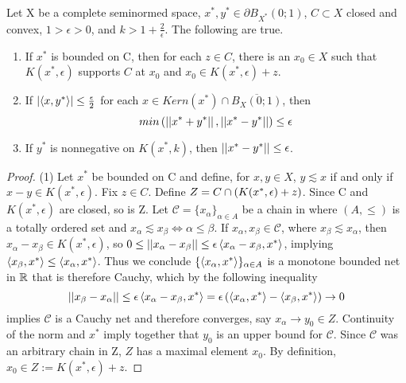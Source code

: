 \begin{lem}
    \label{lem:BishopPhelps}
    
    Let X be a complete seminormed space, $x^*,y^* \in \partial B_{X^*}(0;1)$, $C \subset X$ closed and convex, $1>\epsilon >0$, and $k>1+\frac{2}{\epsilon}$. The following are true. 
    \begin{enumerate}
        \item If $x^*$ is bounded on C, then for each $z \in C$, there is an $x_0 \in X$ such that $K(x^*,\epsilon)$ supports $C$ at $x_0$ and $x_0 \in K(x^*,\epsilon)+z$. 
        \item If $\left| \left\langle x,y^* \right\rangle \right|\leq \frac{\epsilon}{2}$ for each $x \in Kern(x^*) \cap \overline{B_X(0;1)}$, then 
        \begin{equation}
            min\left( \left|\left| x^*+y^* \right|\right|,\left|\left| x^*-y^* \right|\right|\right) \leq \epsilon
        \end{equation}
        \item If $y^*$ is nonnegative on $K(x^*,k)$, then $\left|\left| x^*-y^* \right|\right|\leq \epsilon$.
    \end{enumerate}
    \begin{proof}(1)
        Let $x^*$ be bounded on C and define, for $x,y \in X$, $y \lesssim x$ if and only if $x-y \in K(x^*,\epsilon)$. 
        Fix $z \in C$. 
        Define $Z=C \cap \left(  K(x^*,\epsilon)+z\right)$. Since C and $K(x^*,\epsilon)$ are closed, so is Z. 
        Let $\mathcal{C}=\{x_\alpha\}_{\alpha \in A}$ be a chain in  where $(A,\leq)$ is a totally ordered set and $x_\alpha \lesssim x_\beta \iff \alpha \leq \beta$.  
        If $x_\alpha,x_\beta \in \mathcal{C}$, where $x_\beta \lesssim x_\alpha$, then $x_\alpha-x_\beta \in K(x^*,\epsilon)$, so $0 \leq ||x_\alpha-x_\beta|| \leq \epsilon \left\langle x_\alpha-x_\beta,x^* \right\rangle$, implying $\left\langle x_\beta,x^* \right\rangle \leq \left\langle x_\alpha,x^* \right\rangle$. Thus we conclude $\{\left\langle x_\alpha,x^* \right\rangle\}_{\alpha \in A}$ is a monotone bounded net in $\mathbb{R}$ that is therefore Cauchy, which by the following inequality 
        \begin{equation}
            ||x_\beta-x_\alpha|| \leq \epsilon \left\langle x_\alpha-x_\beta,x^* \right\rangle = \epsilon \left(  \left\langle x_\alpha,x^* \right\rangle-\left\langle x_\beta,x^* \right\rangle\right) \to 0
        \end{equation}
        implies $\mathcal{C}$ is a Cauchy net and therefore converges, say $x_\alpha \to y_0 \in Z$. Continuity of the norm and $x^*$ imply together that $y_0$ is an upper bound for $\mathcal{C}$.  Since $\mathcal{C}$ was an arbitrary chain in Z, $Z$ has a maximal element $x_0$.
        By definition, $x_0 \in Z:=K(x^*,\epsilon)+z$.

\end{proof}
\end{lem}
